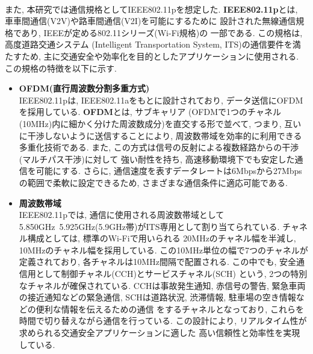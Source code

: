\\[1em]
\indent また, 本研究では通信規格としてIEEE802.11pを想定した. 
\textbf{IEEE802.11p}とは, 車車間通信(V2V)や路車間通信(V2I)を可能にするために
設計された無線通信規格であり, IEEEが定める802.11シリーズ(Wi-Fi規格)の
一部である. この規格は, 高度道路交通システム
(Intelligent Transportation System, ITS)の通信要件を満たすため, 
主に交通安全や効率化を目的としたアプリケーションに使用される.\\
\indent この規格の特徴を以下に示す. 
\begin{itemize}
  \item \textbf{OFDM(直行周波数分割多重方式)}\\
  \indent IEEE802.11pは, IEEE802.11aをもとに設計されており, 
  データ送信にOFDMを採用している. \textbf{OFDM}とは, サブキャリア
  (OFDMで1つのチャネル(10MHz)内に細かく分けた周波数成分)を直交する形で並べて, 
  つまり, 互いに干渉しないように送信することにより, 周波数帯域を効率的に利用できる多重化技術である. 
  また, この方式は信号の反射による複数経路からの干渉(マルチパス干渉)に対して
  強い耐性を持ち, 高速移動環境下でも安定した通信を可能にする. さらに, 
  通信速度を表すデータレートは6Mbpsから27Mbpsの範囲で柔軟に設定できるため, 
  さまざまな通信条件に適応可能である. 
  \item \textbf{周波数帯域}\\
  \indent IEEE802.11pでは, 通信に使用される周波数帯域として
  5.850GHz~5.925GHz(5.9GHz帯)がITS専用として割り当てられている. 
  チャネル構成としては, 標準のWi-Fiで用いられる
  20MHzのチャネル幅を半減し, 10MHzのチャネル幅を採用している. 
  この10MHz単位の幅で7つのチャネルが定義されており, 
  各チャネルは10MHz間隔で配置される. 
  この中でも, 安全通信用として制御チャネル(CCH)とサービスチャネル(SCH)
  という, 2つの特別なチャネルが確保されている. 
  CCHは事故発生通知, 赤信号の警告, 緊急車両の接近通知などの緊急通信, 
  SCHは道路状況, 渋滞情報, 駐車場の空き情報などの便利な情報を伝えるための通信
  をするチャネルとなっており,  これらを時間で切り替えながら通信を行っている. 
  この設計により, リアルタイム性が求められる交通安全アプリケーションに適した
  高い信頼性と効率性を実現している. 
\end{itemize}
